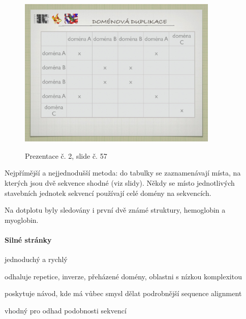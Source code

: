 \documentclass[DIV=8]{scrreprt}
\begin{document}
\begin{figure}
    \caption{Prezentace č. 2, slide č. 57}
    \includegraphics[width=0.85\textwidth]{slides-2/slide-57.jpg}
    \centering
    \label{slides-2-slide-57}
\end{figure}

Nejpřímější a nejjednodušší metoda: do tabulky se zaznamenávají místa, na kterých jsou dvě sekvence shodné (viz slidy). Někdy se místo jednotlivých stavebních jednotek sekvencí používají celé domény na sekvencích.

Na dotplotu byly sledovány i první dvě známé struktury, hemoglobin a myoglobin.

\paragraph{Silné stránky}
\begin{myItemize}[nosep]
    \item jednoduchý a rychlý
    \item odhaluje repetice, inverze, přeházené domény, oblastni s nízkou komplexitou
    \item poskytuje návod, kde má vůbec smysl dělat podrobnější sequence alignment
    \item vhodný pro odhad podobnosti sekvencí
\end{myItemize}
\end{document}
